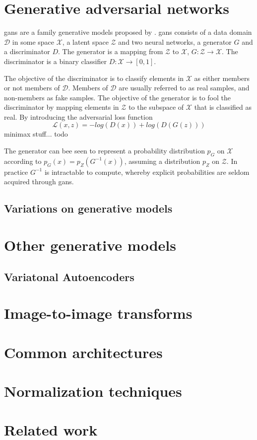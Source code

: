 \section{Generative adversarial networks}
\acrfull{gans} are a family generative models proposed by \textcite{goodfellow2014generative}. \acrshort{gans} consists of a data domain $\mathcal{D}$ in some space $\mathcal{X}$, a latent space $\mathcal{Z}$ and two neural networks, a generator $G$ and a discriminator $D$. The generator is a mapping from $\mathcal{Z}$ to $\mathcal{X}$, $G: \mathcal{Z} \rightarrow \mathcal{X}$. The discriminator is a binary classifier $D: \mathcal{X} \rightarrow [0, 1]$. 

The objective of the discriminator is to classify elements in $\mathcal{X}$ as either members or not members of $\mathcal{D}$. Members of $\mathcal{D}$ are usually referred to as real samples, and non-members as fake samples. The objective of the generator is to fool the discriminator by mapping elements in $\mathcal{Z}$ to the subspace of $\mathcal{X}$ that is classified as real. By introducing the adversarial loss function
\begin{equation}
    \mathcal{L}(x, z) = -log(D(x)) + log(D(G(z)))
\end{equation}
minimax stuff... todo

The generator can bee seen to represent a probability distribution $p_G$ on $\mathcal{X}$ according to $p_G(x) = p_Z(G^{-1}(x))$, assuming a distribution $p_Z$ on $\mathcal{Z}$. In practice $G^{-1}$ is intractable to compute, whereby explicit probabilities are seldom acquired through \acrshort{gans}.


\subsection{Variations on generative models}

\section{Other generative models}

\subsection{Variatonal Autoencoders}

\section{Image-to-image transforms}

\section{Common architectures}

\section{Normalization techniques}

\section{Related work}




